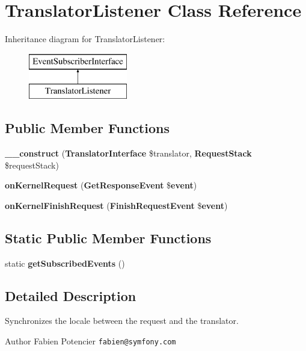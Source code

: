 \section{Translator\+Listener Class Reference}
\label{class_symfony_1_1_component_1_1_http_kernel_1_1_event_listener_1_1_translator_listener}
Inheritance diagram for Translator\+Listener\+:\begin{figure}[H]
\begin{center}
\leavevmode
\includegraphics[height=2.000000cm]{class_symfony_1_1_component_1_1_http_kernel_1_1_event_listener_1_1_translator_listener}
\end{center}
\end{figure}
\subsection*{Public Member Functions}
\begin{DoxyCompactItemize}
\item 
{\bf \+\_\+\+\_\+construct} ({\bf Translator\+Interface} \$translator, {\bf Request\+Stack} \$request\+Stack)
\item 
{\bf on\+Kernel\+Request} ({\bf Get\+Response\+Event} \${\bf event})
\item 
{\bf on\+Kernel\+Finish\+Request} ({\bf Finish\+Request\+Event} \${\bf event})
\end{DoxyCompactItemize}
\subsection*{Static Public Member Functions}
\begin{DoxyCompactItemize}
\item 
static {\bf get\+Subscribed\+Events} ()
\end{DoxyCompactItemize}


\subsection{Detailed Description}
Synchronizes the locale between the request and the translator.

\begin{DoxyAuthor}{Author}
Fabien Potencier {\tt fabien@symfony.\+com} 
\end{DoxyAuthor}


